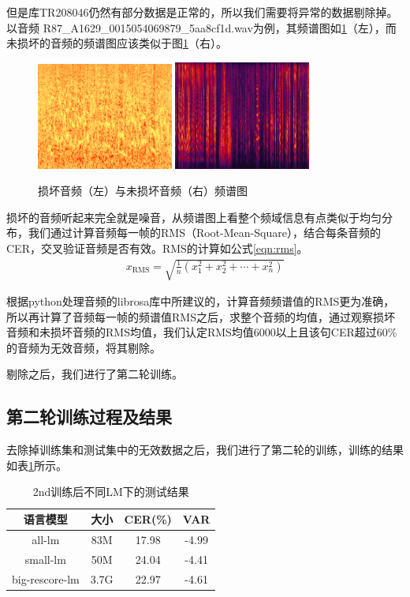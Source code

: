 但是库TR208046仍然有部分数据是正常的，所以我们需要将异常的数据剔除掉。以音频 R87\_A1629\_0015054069879\_5aa8cf1d.wav为例，其频谱图如\ref{fig:audio-freq}（左），而未损坏的音频的频谱图应该类似于图\ref{fig:audio-freq}（右）。
\begin{figure}[!ht]
	\centering
	\includegraphics[width=0.40\textwidth]{figure/error-audio}
	\hspace{1cm}
	\includegraphics[width=0.40\textwidth]{figure/right-audio}
	\caption{损坏音频（左）与未损坏音频（右）频谱图}
\label{fig:audio-freq}
\end{figure}

损坏的音频听起来完全就是噪音，从频谱图上看整个频域信息有点类似于均匀分布，我们通过计算音频每一帧的RMS（Root-Mean-Square），结合每条音频的CER，交叉验证音频是否有效。RMS的计算如公式\ref{eqn:rms}。
\begin{align}
\label{eqn:rms}
	x_{\mathrm{RMS}}=\sqrt{\frac{1}{n}\left(x_{1}^{2}+x_{2}^{2}+\cdots+x_{n}^{2}\right)}
\end{align}

根据python处理音频的librosa库中所建议的，计算音频频谱值的RMS更为准确，所以再计算了音频每一帧的频谱值RMS之后，求整个音频的均值，通过观察损坏音频和未损坏音频的RMS均值，我们认定RMS均值6000以上且该句CER超过60\%的音频为无效音频，将其剔除。

剔除之后，我们进行了第二轮训练。

\subsection{第二轮训练过程及结果}
去除掉训练集和测试集中的无效数据之后，我们进行了第二轮的训练，训练的结果如表\ref{tab:second-train}所示。
\begin{table}[h]
 \centering
 \caption{2nd训练后不同LM下的测试结果}
	 \begin{tabular*}{1\textwidth}{@{\extracolsep{\fill}}cccc}
	 \toprule
		{\bf 语言模型} & {\bf 大小} & {\bf CER(\%)} &{\bf VAR} \\
	 \midrule
	   all-lm         &  83M   & 17.98   &  -4.99 \\
	   small-lm       &  50M   & 24.04   &  -4.41 \\
	   big-rescore-lm &  3.7G  & 22.97   &  -4.61 \\
	 \bottomrule
	 \end{tabular*}%
 \label{tab:second-train}%
\end{table}%

